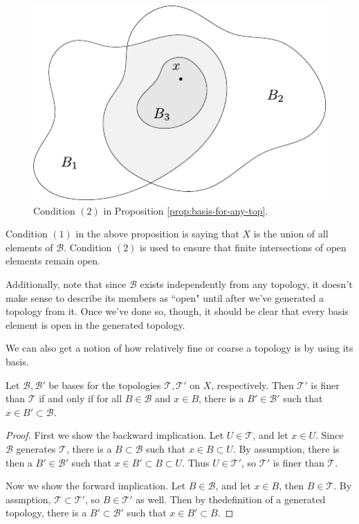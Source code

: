 \documentclass[10pt]{report}
\begin{document}
\begin{figure}[H]
	\centering
	\includegraphics[scale=1]{fig/basis.pdf}
	\caption{Condition $(2)$ in Proposition \ref{prop:basis-for-any-top}.}
\end{figure}

Condition $(1)$ in the above proposition is saying that $X$ is the union of all elements of $\mathcal{B}$. Condition $(2)$ is used to ensure that finite intersections of open elements remain open.

Additionally, note that since $\mathcal{B}$ exists independently from any topology, it doesn't make sense to describe its members as ``open" until after we've generated a topology from it. Once we've done so, though, it should be clear that every basis element is open in the generated topology.

We can also get a notion of how relatively fine or coarse a topology is by using its basis.

\begin{prop}
	Let $\mathcal{B}, \mathcal{B}'$ be bases for the topologies $\mathcal{T},\mathcal{T}'$ on $X$, respectively. Then $\mathcal{T}'$ is finer than $\mathcal{T}$ if and only if for all $B \in \mathcal{B}$ and $x \in B$, there is a $B' \in \mathcal{B}'$ such that $x \in B' \subset \mathcal{B}$.
\end{prop}
\begin{proof}
	First we show the backward implication. Let $U \in \mathcal{T}$, and let $x \in U$. Since $\mathcal{B}$ generates $\mathcal{T}$, there is a $B \subset \mathcal{B}$ such that $x \in B \subset U$. By assumption, there is then a $B' \in \mathcal{B}'$ such that $x \in B' \subset B \subset U$. Thus $U \in \mathcal{T}'$, so $\mathcal{T}'$ is finer than $\mathcal{T}$.

	Now we show the forward implication. Let $B \in \mathcal{B}$, and let $x \in B$, then $B \in \mathcal{T}$. By assmption, $\mathcal{T} \subset \mathcal{T}'$, so $B \in \mathcal{T}'$ as well. Then by thedefinition of a generated topology, there is a $B' \subset \mathcal{B}'$ such that $x \in B' \subset B$.
\end{proof}
\end{document}
